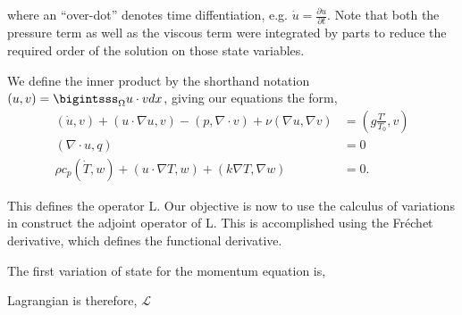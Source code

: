 \documentclass{article}
\begin{document}
where an ``over-dot'' denotes time diffentiation, e.g. $\dot u =
\frac{\partial u}{\partial t}$. Note that both the pressure term as well
as the viscous term were integrated by parts to reduce the required
order of the solution on those state variables.  

We define the inner product by the shorthand notation $(u,v) =
\bigintsss_\Omega u\cdot v dx $, giving our equations the form,  
\begin{align}
 (\dot u,v) + (u \cdot \nabla u, v) - (p,\nabla \cdot v) + \nu (\nabla
 u, \nabla v) &= (g \frac{T'}{T_0},v) \\
 (\nabla \cdot u, q) &= 0 \\
  \rho c_p (\dot T,w) + (u \cdot \nabla T,w) + (k \nabla T,\nabla w) &= 0.
\end{align}

This defines the operator L. Our objective is now to use the calculus of
variations in construct the adjoint operator of L. This is accomplished
using the Fr\'echet derivative, which defines the functional
derivative. 

The first variation of state for the momentum equation is,

Lagrangian is therefore,
$\mathcal{L}$
\end{document}
